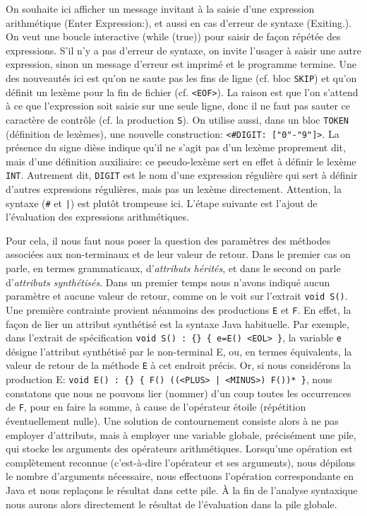 \documentclass[11pt,a4paper]{article}
\newcommand{\Java}{\textsf{Java}\xspace}
\begin{document}
\noindent On souhaite ici afficher un message invitant à la saisie
d'une expression arithmétique (\textsf{Enter Expression:}), et aussi
en cas d'erreur de syntaxe (\textsf{Exiting.}). On veut une boucle
interactive (\textsf{while (true)}) pour saisir de façon répétée des
expressions. S'il n'y a pas d'erreur de syntaxe, on invite l'usager à
saisir une autre expression, sinon un message d'erreur est imprimé et
le programme termine. Une des nouveautés ici est qu'on ne saute pas
les fins de ligne (cf. bloc \texttt{SKIP}) et qu'on définit un lexème
pour la fin de fichier (cf. \texttt{<EOF>}). La raison est que l'on
s'attend à ce que l'expression soit saisie sur une seule ligne, donc
il ne faut pas sauter ce caractère de contrôle (cf. la production
\texttt{S}). On utilise aussi, dans un bloc \texttt{TOKEN} (définition
de lexèmes), une nouvelle construction: \texttt{<\#DIGIT:
  ["0"-"9"]>}. La présence du signe dièse indique qu'il ne s'agit pas
d'un lexème proprement dit, mais d'une définition auxiliaire: ce
pseudo-lexème sert en effet à définir le lexème
\texttt{INT}. Autrement dit, \texttt{DIGIT} est le nom d'une
expression régulière qui sert à définir d'autres expressions
régulières, mais pas un lexème directement. Attention, la syntaxe
(\verb+#+ et \verb+|+) est plutôt trompeuse ici. L'étape suivante est
l'ajout de l'évaluation des expressions arithmétiques.

Pour cela, il nous faut nous poser la question des paramètres des
méthodes associées aux non-terminaux et de leur valeur de retour. Dans
le premier cas on parle, en termes grammaticaux, d'\emph{attributs
  hérités}, et dans le second on parle d'\emph{attributs
  synthétisés}. Dans un premier temps nous n'avons indiqué aucun
paramètre et aucune valeur de retour, comme on le voit sur l'extrait
{\small \verb+void S()+}. Une première contrainte provient néanmoins
des productions {\small \verb+E+} et {\small \verb+F+}. En effet, la
façon de lier un attribut synthétisé est la syntaxe \Java
habituelle. Par exemple, dans l'extrait de spécification {\small
  \verb+void S() : {} { e=E() <EOL> }+}, la variable \verb+e+ désigne
l'attribut synthétisé par le non-terminal E, ou, en termes
équivalents, la valeur de retour de la méthode \verb+E+ à cet endroit
précis. Or, si nous considérons la production E: {\small
  \verb+void E() : {} { F() ((<PLUS> | <MINUS>) F())* }+}, nous
constatons que nous ne pouvons lier (nommer) d'un coup toutes les
occurrences de {\small \verb+F+}, pour en faire la somme, à cause de
l'opérateur étoile (répétition éventuellement nulle). Une solution de
contournement consiste alors à ne pas employer d'attributs, mais à
employer une variable globale, précisément une pile, qui stocke les
arguments des opérateurs arithmétiques. Lorsqu'une opération est
complètement reconnue (c'est-à-dire l'opérateur et ses arguments),
nous dépilons le nombre d'arguments nécessaire, nous effectuons
l'opération correspondante en \Java et nous replaçons le résultat dans
cette pile. À la fin de l'analyse syntaxique nous aurons alors
directement le résultat de l'évaluation dans la pile globale.
\end{document}
